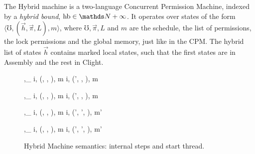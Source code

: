 The Hybrid machine is a two-language Concurrent Permission Machine, indexed by a \emph{hybrid bound}, $\text{hb} \in \nat + \infty$. It operates over states of the form 
$\langle\mho, (\vec{h}, \vec{\pi}, L), m \rangle$, where  $\mho, \vec{\pi}, L$ and $m$ are the schedule, the list 
of permissions, the lock permissions and the global memory, just like in the CPM. 
The hybrid list of states $\vec{h}$ contains marked local states, such that the first  states are in Assembly and the rest in Clight. 

\begin{figure}

  {
\Psi,\Phi \vdash_ 
\langle i\cdot\mho, (, \vec{\pi}, \lockpool), m \rangle
\stackrel{~}\mapsto
\langle i\cdot\mho, (', \vec{\pi}, \lockpool), m\rangle
  }

  {
\Psi,\Phi \vdash_ 
\langle i\cdot\mho, (, \vec{\pi}, \lockpool), m \rangle
\stackrel{~}\mapsto
\langle i\cdot\mho, (', \vec{\pi}, \lockpool), m\rangle
  }
  
  
  {
\Psi,\Phi \vdash_ \!\!
\langle i\cdot\mho, (, \vec{\pi}, \lockpool), m \rangle
{}\mapsto
\langle i\cdot\mho, (', \vec{\pi}', \lockpool), m'\rangle\!\!
  }
  
  
  {
\Psi,\Phi \vdash_ \!\!
\langle i\cdot\mho, (, \vec{\pi}, \lockpool), m \rangle
{}\mapsto
\langle i\cdot\mho, (', \vec{\pi}', \lockpool), m'\rangle\!\!
  }
 
\caption[Hybrid Machine semantics]{Hybrid Machine semantics: internal steps and start thread. }
\label{fig:hybrid}
\end{figure}

